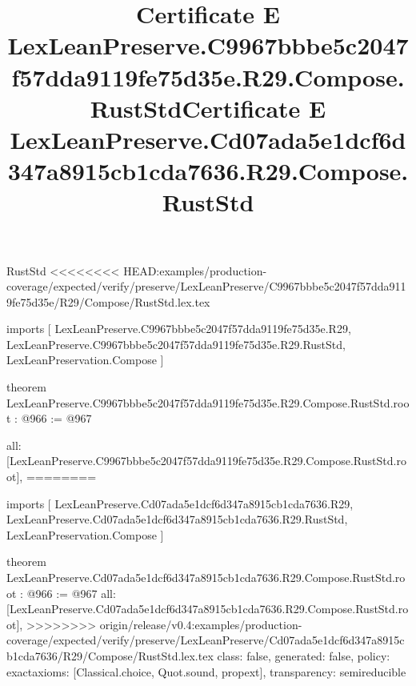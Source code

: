 \begin{lexlean}{RustStd}
<<<<<<<< HEAD:examples/production-coverage/expected/verify/preserve/LexLeanPreserve/C9967bbbe5c2047f57dda9119fe75d35e/R29/Compose/RustStd.lex.tex
\title{Certificate E LexLeanPreserve.C9967bbbe5c2047f57dda9119fe75d35e.R29.Compose.RustStd}
\begin{coremodule}
imports [
  LexLeanPreserve.C9967bbbe5c2047f57dda9119fe75d35e.R29,
  LexLeanPreserve.C9967bbbe5c2047f57dda9119fe75d35e.R29.RustStd,
  LexLeanPreservation.Compose
]

theorem LexLeanPreserve.C9967bbbe5c2047f57dda9119fe75d35e.R29.Compose.RustStd.root : @966 := @967 {
  all: [LexLeanPreserve.C9967bbbe5c2047f57dda9119fe75d35e.R29.Compose.RustStd.root],
========
\title{Certificate E LexLeanPreserve.Cd07ada5e1dcf6d347a8915cb1cda7636.R29.Compose.RustStd}
\begin{coremodule}
imports [
  LexLeanPreserve.Cd07ada5e1dcf6d347a8915cb1cda7636.R29,
  LexLeanPreserve.Cd07ada5e1dcf6d347a8915cb1cda7636.R29.RustStd,
  LexLeanPreservation.Compose
]

theorem LexLeanPreserve.Cd07ada5e1dcf6d347a8915cb1cda7636.R29.Compose.RustStd.root : @966 := @967 {
  all: [LexLeanPreserve.Cd07ada5e1dcf6d347a8915cb1cda7636.R29.Compose.RustStd.root],
>>>>>>>> origin/release/v0.4:examples/production-coverage/expected/verify/preserve/LexLeanPreserve/Cd07ada5e1dcf6d347a8915cb1cda7636/R29/Compose/RustStd.lex.tex
  class: false,
  generated: false,
  policy: exact{axioms: [Classical.choice, Quot.sound, propext]},
  transparency: semireducible
}


\end{coremodule}}
\end{coremodule}
\end{lexlean}
